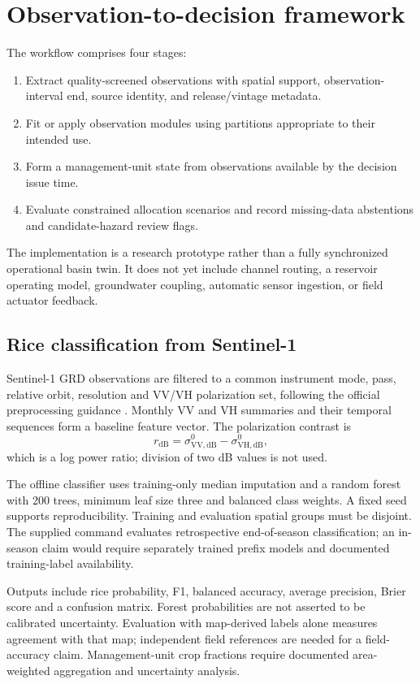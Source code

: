 \documentclass[11pt]{article}
\begin{document}
\section{Observation-to-decision framework}
The workflow comprises four stages:
\begin{enumerate}
\item Extract quality-screened observations with spatial support, observation-interval end, source identity, and release/vintage metadata.
\item Fit or apply observation modules using partitions appropriate to their intended use.
\item Form a management-unit state from observations available by the decision issue time.
\item Evaluate constrained allocation scenarios and record missing-data abstentions and candidate-hazard review flags.
\end{enumerate}
The implementation is a research prototype rather than a fully synchronized operational basin twin. It does not yet include channel routing, a reservoir operating model, groundwater coupling, automatic sensor ingestion, or field actuator feedback.

\subsection{Rice classification from Sentinel-1}
Sentinel-1 GRD observations are filtered to a common instrument mode, pass, relative orbit, resolution and VV/VH polarization set, following the official preprocessing guidance \cite{s1}. Monthly VV and VH summaries and their temporal sequences form a baseline feature vector. The polarization contrast is
\begin{equation}
r_{\mathrm{dB}}=\sigma^0_{\mathrm{VV,dB}}-\sigma^0_{\mathrm{VH,dB}},
\end{equation}
which is a log power ratio; division of two dB values is not used.

The offline classifier uses training-only median imputation and a random forest with 200 trees, minimum leaf size three and balanced class weights. A fixed seed supports reproducibility. Training and evaluation spatial groups must be disjoint. The supplied command evaluates retrospective end-of-season classification; an in-season claim would require separately trained prefix models and documented training-label availability.

Outputs include rice probability, F1, balanced accuracy, average precision, Brier score and a confusion matrix. Forest probabilities are not asserted to be calibrated uncertainty. Evaluation with map-derived labels alone measures agreement with that map; independent field references are needed for a field-accuracy claim. Management-unit crop fractions require documented area-weighted aggregation and uncertainty analysis.
\end{document}
